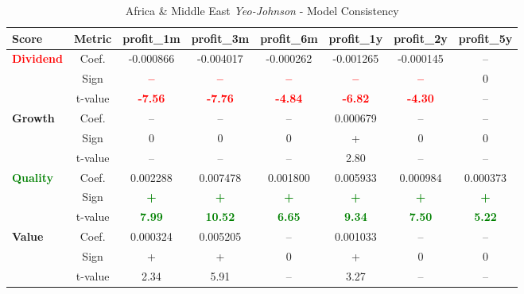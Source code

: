 \documentclass[11pt,english,a4paper,hidelinks]{book}
\begin{document}
\begin{table}[H]
    \centering
    \caption{Africa \& Middle East \textit{Yeo-Johnson} - Model Consistency}
    \begin{tabular}{lccccccc}
        \toprule
        \textbf{Score} & \textbf{Metric} & \textbf{profit\_1m} & \textbf{profit\_3m} & \textbf{profit\_6m} & \textbf{profit\_1y} & \textbf{profit\_2y} & \textbf{profit\_5y} \\
        \midrule
        \multirow{3}{*}{\textbf{\textcolor{red}{Dividend}}} 
            & Coef. & -0.000866 & -0.004017 & -0.000262 & -0.001265 & -0.000145 & -- \\
            & Sign & \textbf{\textcolor{red}{–}} & \textbf{\textcolor{red}{–}} & \textbf{\textcolor{red}{–}} & \textbf{\textcolor{red}{–}} & \textbf{\textcolor{red}{–}} & 0 \\
            & t-value & \textbf{\textcolor{red}{-7.56}} & \textbf{\textcolor{red}{-7.76}} & \textbf{\textcolor{red}{-4.84}} & \textbf{\textcolor{red}{-6.82}} & \textbf{\textcolor{red}{-4.30}} & -- \\
        \midrule
        \multirow{3}{*}{\textbf{Growth}} 
            & Coef. & -- & -- & -- & 0.000679 & -- & -- \\
            & Sign & 0 & 0 & 0 & + & 0 & 0 \\
            & t-value & -- & -- & -- & 2.80 & -- & -- \\
        \midrule
        \multirow{3}{*}{\textbf{\textcolor{green}{Quality}}} 
            & Coef. & 0.002288 & 0.007478 & 0.001800 & 0.005933 & 0.000984 & 0.000373 \\
            & Sign & \textbf{\textcolor{green}{+}} & \textbf{\textcolor{green}{+}} & \textbf{\textcolor{green}{+}} & \textbf{\textcolor{green}{+}} & \textbf{\textcolor{green}{+}} & \textbf{\textcolor{green}{+}} \\
            & t-value & \textbf{\textcolor{green}{7.99}} & \textbf{\textcolor{green}{10.52}} & \textbf{\textcolor{green}{6.65}} & \textbf{\textcolor{green}{9.34}} & \textbf{\textcolor{green}{7.50}} & \textbf{\textcolor{green}{5.22}} \\
        \midrule
        \multirow{3}{*}{\textbf{Value}} 
            & Coef. & 0.000324 & 0.005205 & -- & 0.001033 & -- & -- \\
            & Sign & + & + & 0 & + & 0 & 0 \\
            & t-value & 2.34 & 5.91 & -- & 3.27 & -- & -- \\
        \bottomrule
    \end{tabular}
    \label{tab:africa_gaussian_model_consistency}
\end{table}
\end{document}
